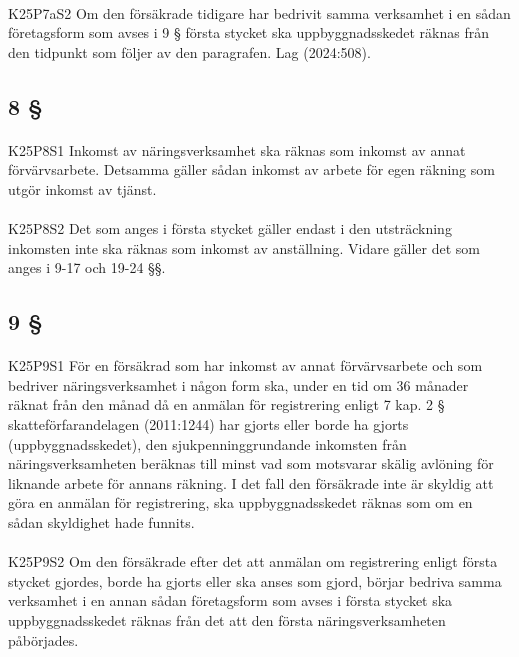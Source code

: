 \documentclass[a4paper,notitlepage,openany,10pt]{book}
\begin{document}
\paragraph*{}
{\tiny K25P7aS2}
Om den försäkrade tidigare har bedrivit samma verksamhet i en sådan företagsform som avses i 9 § första stycket ska uppbyggnadsskedet räknas från den tidpunkt som följer av den paragrafen.
Lag (2024:508).
\subsection*{8 §}
\paragraph*{}
{\tiny K25P8S1}
Inkomst av näringsverksamhet ska räknas som inkomst av annat förvärvsarbete. Detsamma gäller sådan inkomst av arbete för egen räkning som utgör inkomst av tjänst.
\paragraph*{}
{\tiny K25P8S2}
Det som anges i första stycket gäller endast i den utsträckning inkomsten inte ska räknas som inkomst av anställning. Vidare gäller det som anges i 9-17 och 19-24 §§.
\subsection*{9 §}
\paragraph*{}
{\tiny K25P9S1}
För en försäkrad som har inkomst av annat förvärvsarbete och som bedriver näringsverksamhet i någon form ska, under en tid om 36 månader räknat från den månad då en anmälan för registrering enligt 7 kap. 2 § skatteförfarandelagen (2011:1244) har gjorts eller borde ha gjorts (uppbyggnadsskedet), den sjukpenninggrundande inkomsten från näringsverksamheten beräknas till minst vad som motsvarar skälig avlöning för liknande arbete för annans räkning. I det fall den försäkrade inte är skyldig att göra en anmälan för registrering, ska uppbyggnadsskedet räknas som om en sådan skyldighet hade funnits.
\paragraph*{}
{\tiny K25P9S2}
Om den försäkrade efter det att anmälan om registrering enligt första stycket gjordes, borde ha gjorts eller ska anses som gjord, börjar bedriva samma verksamhet i en annan sådan företagsform som avses i första stycket ska uppbyggnadsskedet räknas från det att den första näringsverksamheten påbörjades.
\end{document}
